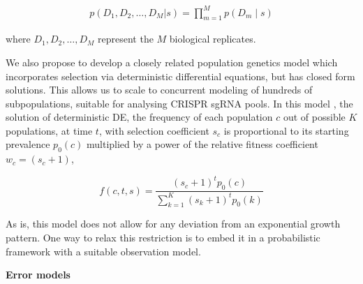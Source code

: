 \documentclass{article}
\begin{document}
\begin{equation}
\label{eq:wfhie}
\begin{split}
p( D_1, D_2, \ldots, D_M | s) =  \prod_{m=1}^M p(D_m \mid s)
\end{split}
\end{equation}

where $D_1, D_2, \ldots, D_M$ represent the $M$ biological replicates.


We also propose to develop a closely related population genetics model which incorporates selection via deterministic differential equations, but has closed form solutions.
This allows us to scale to concurrent modeling of hundreds of subpopulations, suitable for analysing CRISPR sgRNA pools.
In this model \cite{sallybioguide}, the solution of deterministic DE, the frequency of each population $c$ out of possible $K$ populations, at time $t$, with selection coefficient $s_c$ is proportional to its starting prevalence $p_0(c)$ multiplied by a power of the relative fitness coefficient $w_c = (s_c + 1)$,

\begin{equation} \label{eq:wfde}
    f(c,t,s) = \frac{(s_c+1)^t p_0(c) }{\sum_{k=1}^{K} (s_k+1)^t p_0(k) }
\end{equation}

As is, this model does not allow for any deviation from an exponential growth pattern. 
One way to relax this restriction is to embed it in a probabilistic framework with a suitable observation model.

\textbf{Error models}

\begin{comment}
We have considered two scenarios for the error models.
First, a sample of $N_t$ cells is taken from the tumour mass at timepoint $t$ and then partitioned into $K$ clones.
This is the case, for example, when the subpopulations are inferred by phylogenetic analysis; that is, when each clone is defined as a clade in the phylogenetic tree. 
We will model the observed counts with a Dirichlet-Multinomial distribution with concentration parameter $\alpha$,
which could be regarded as an over-dispersed Multinomial distribution. 
It captures the uncertainty on the populations fractions due to different sample sizes $N_t$ at each timepoint $t$. 
\end{comment}
\end{document}
